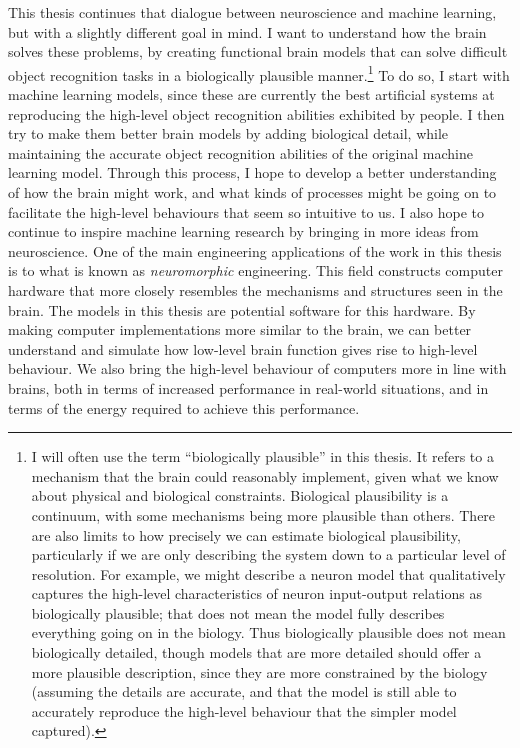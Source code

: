 This thesis continues that dialogue between neuroscience and machine learning,
but with a slightly different goal in mind.
I want to understand how the brain solves these problems,
by creating functional brain models
that can solve difficult object recognition tasks
in a biologically plausible manner.\footnote{
  I will often use the term ``biologically plausible'' in this thesis.
  It refers to a mechanism that the brain could reasonably implement,
  given what we know about physical and biological constraints.
  Biological plausibility is a continuum,
  with some mechanisms being more plausible than others.
  There are also limits to how precisely we can estimate biological plausibility,
  particularly if we are only describing the system down to
  a particular level of resolution.
  For example, we might describe a neuron model that qualitatively captures
  the high-level characteristics of neuron input-output relations
  as biologically plausible;
  that does not mean the model fully describes everything going on in the biology.
  Thus biologically plausible does not mean biologically detailed,
  though models that are more detailed should offer a more plausible description,
  since they are more constrained by the biology
  (assuming the details are accurate,
  and that the model is still able to accurately reproduce
  the high-level behaviour that the simpler model captured).
  }
To do so, I start with machine learning models,
since these are currently the best artificial systems
at reproducing the high-level object recognition abilities exhibited by people.
I then try to make them better brain models by adding biological detail,
while maintaining the accurate object recognition abilities
of the original machine learning model.
Through this process,
I hope to develop a better understanding of how the brain might work,
and what kinds of processes might be going on to facilitate
the high-level behaviours that seem so intuitive to us.
I also hope to continue to inspire machine learning research
by bringing in more ideas from neuroscience.
One of the main engineering applications of the work in this thesis
is to what is known as \emph{neuromorphic} engineering.
This field constructs computer hardware that more closely resembles
the mechanisms and structures seen in the brain.
The models in this thesis are potential software for this hardware.
By making computer implementations more similar to the brain,
we can better understand and simulate how low-level brain function
gives rise to high-level behaviour.
We also bring the high-level behaviour of computers more in line with brains,
both in terms of increased performance in real-world situations,
and in terms of the energy required to achieve this performance.


